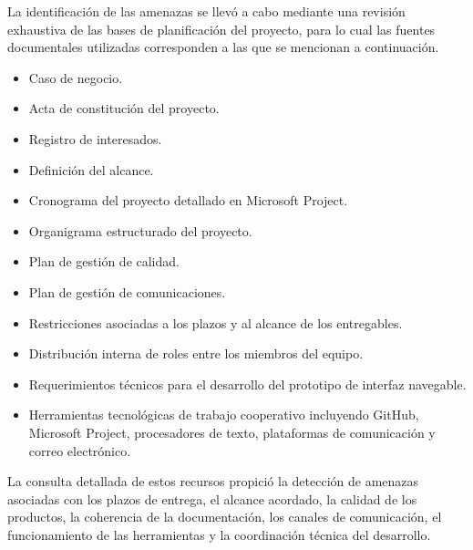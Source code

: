 \documentclass[11pt,spanish]{article}
\begin{document}
La identificación de las amenazas se llevó a cabo mediante una revisión exhaustiva de las bases de planificación del proyecto, para lo cual las fuentes documentales utilizadas corresponden a las que se mencionan a continuación.

\begin{itemize}[leftmargin=*, label={\textbullet}]
    \item Caso de negocio.
    \item Acta de constitución del proyecto.
    \item Registro de interesados.
    \item Definición del alcance.
    \item Cronograma del proyecto detallado en Microsoft Project.
    \item Organigrama estructurado del proyecto.
    \item Plan de gestión de calidad.
    \item Plan de gestión de comunicaciones.
    \item Restricciones asociadas a los plazos y al alcance de los entregables.
    \item Distribución interna de roles entre los miembros del equipo.
    \item Requerimientos técnicos para el desarrollo del prototipo de interfaz navegable.
    \item Herramientas tecnológicas de trabajo cooperativo incluyendo GitHub, Microsoft Project, procesadores de texto, plataformas de comunicación y correo electrónico.
\end{itemize}

La consulta detallada de estos recursos propició la detección de amenazas asociadas con los plazos de entrega, el alcance acordado, la calidad de los productos, la coherencia de la documentación, los canales de comunicación, el funcionamiento de las herramientas y la coordinación técnica del desarrollo.
\end{document}
